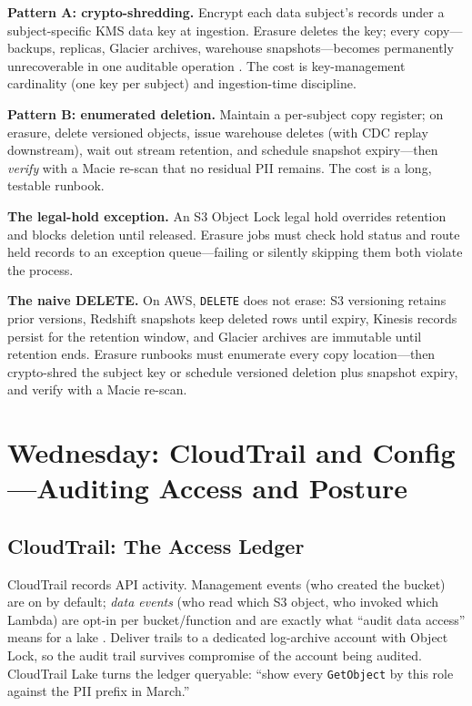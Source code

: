 \textbf{Pattern A: crypto-shredding.} Encrypt each data subject's records under a subject-specific KMS data key at ingestion. Erasure deletes the key; every copy---backups, replicas, Glacier archives, warehouse snapshots---becomes permanently unrecoverable in one auditable operation \cite{awsKMSDocs}. The cost is key-management cardinality (one key per subject) and ingestion-time discipline.

\textbf{Pattern B: enumerated deletion.} Maintain a per-subject copy register; on erasure, delete versioned objects, issue warehouse deletes (with CDC replay downstream), wait out stream retention, and schedule snapshot expiry---then \emph{verify} with a Macie re-scan that no residual PII remains. The cost is a long, testable runbook.

\textbf{The legal-hold exception.} An S3 Object Lock legal hold overrides retention and blocks deletion until released. Erasure jobs must check hold status and route held records to an exception queue---failing or silently skipping them both violate the process.

\begin{pitfall}
\textbf{The naive DELETE.} On AWS, \texttt{DELETE} does not erase: S3 versioning retains prior versions, Redshift snapshots keep deleted rows until expiry, Kinesis records persist for the retention window, and Glacier archives are immutable until retention ends. Erasure runbooks must enumerate every copy location---then crypto-shred the subject key or schedule versioned deletion plus snapshot expiry, and verify with a Macie re-scan.
\end{pitfall}

\section{Wednesday: CloudTrail and Config---Auditing Access and Posture}
\subsection{CloudTrail: The Access Ledger}
CloudTrail records API activity. Management events (who created the bucket) are on by default; \emph{data events} (who read which S3 object, who invoked which Lambda) are opt-in per bucket/function and are exactly what ``audit data access'' means for a lake \cite{awsCloudTrailDocs}. Deliver trails to a dedicated log-archive account with Object Lock, so the audit trail survives compromise of the account being audited. CloudTrail Lake turns the ledger queryable: ``show every \texttt{GetObject} by this role against the PII prefix in March.''

